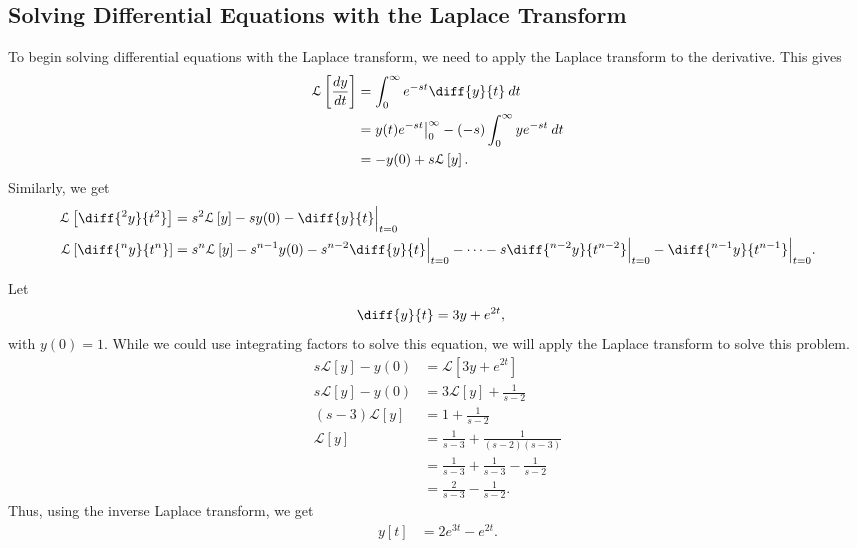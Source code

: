 \documentclass[10pt]{mypackage}
\begin{document}
\subsection{Solving Differential Equations with the Laplace Transform}%
To begin solving differential equations with the Laplace transform, we need to apply the Laplace transform to the derivative. This gives
\begin{align*}
  \mathcal{L}\left[\frac{dy}{dt}\right] &= \int_{0}^{\infty} e^{-st}\diff{y}{t}\:dt\\
                                        &= y(t)e^{-st}\bigr\vert_{0}^{\infty} - \left(-s\right)\int_{0}^{\infty} ye^{-st}\:dt\\
                                        &= -y(0) + s\mathcal{L}\left[y\right].
\end{align*}
Similarly, we get
\begin{align*}
  \mathcal{L}\left[\diff{^2y}{t^2}\right] &= s^2\mathcal{L}\left[y\right] - sy(0) - \diff{y}{t}\Bigr\vert_{t=0}\\
  \mathcal{L}\left[\diff{^n y}{t^n}\right] &= s^n \mathcal{L}\left[y\right] - s^{n-1}y(0) - s^{n-2}\diff{y}{t}\Bigr\vert_{t=0} - \cdots - s\diff{^{n-2}y}{t^{n-2}}\Bigr\vert_{t=0} - \diff{^{n-1}y}{t^{n-1}}\Bigr\vert_{t=0}.
\end{align*}
\begin{example}
  Let
  \begin{align*}
    \diff{y}{t} &= 3y + e^{2t},
  \end{align*}
  with $y(0) = 1$. While we could use integrating factors to solve this equation, we will apply the Laplace transform to solve this problem.
  \begin{align*}
    s\mathcal{L}\left[y\right] - y(0) &= \mathcal{L}\left[3y + e^{2t}\right]\\
    s\mathcal{L}\left[y\right] - y(0) &= 3\mathcal{L}\left[y\right] + \frac{1}{s-2}\\
    \left(s-3\right)\mathcal{L}\left[y\right] &= 1 + \frac{1}{s-2}\\
    \mathcal{L}\left[y\right] &= \frac{1}{s-3} + \frac{1}{\left(s-2\right)\left(s-3\right)}\\
                              &= \frac{1}{s-3} + \frac{1}{s-3} - \frac{1}{s-2}\\
                              &= \frac{2}{s-3} - \frac{1}{s-2}.
  \end{align*}
  Thus, using the inverse Laplace transform, we get
  \begin{align*}
    y\left[t\right] &= 2e^{3t} - e^{2t}.
  \end{align*}
  
\end{example}
\end{document}
